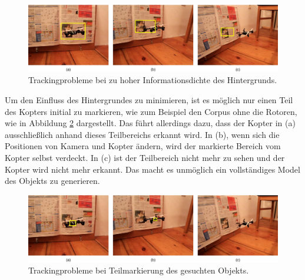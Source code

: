 	\begin{figure}[H]
		\begin{centering}
			\includegraphics[scale=0.5]{../pictures/problem_background_1.jpg}
			\caption{Trackingprobleme bei zu hoher Informationsdichte des Hintergrunds.}
			\label{abb:problem_background_1}
			\par
		\end{centering}
	\end{figure}

	Um den Einfluss des Hintergrundes zu minimieren, ist es möglich nur einen Teil des Kopters initial zu markieren, wie zum Beispiel den Corpus ohne die Rotoren, wie in Abbildung \ref{abb:problem_background_2} dargestellt. Das führt allerdings dazu, dass der Kopter in (a) ausschließlich anhand dieses Teilbereichs erkannt wird. In (b), wenn sich die Positionen von Kamera und Kopter ändern, wird der markierte Bereich vom Kopter selbst verdeckt. In (c) ist der Teilbereich nicht mehr zu sehen und der Kopter wird nicht mehr erkannt. Das macht es unmöglich ein vollständiges Model des Objekts zu generieren.

	\begin{figure}[H]
		\begin{centering}
			\includegraphics[scale=0.5]{../pictures/problem_background_2.jpg}
			\caption{Trackingprobleme bei Teilmarkierung des gesuchten Objekts.}
			\label{abb:problem_background_2}
			\par
		\end{centering}
	\end{figure}
	
	

